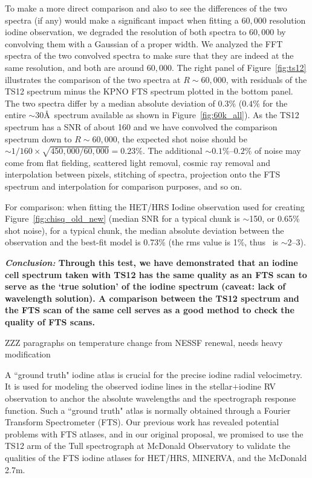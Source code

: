 To make a more direct comparison and also to see the differences of
the two spectra (if any) would make a significant impact when fitting
a $60,000$ resolution iodine observation, we degraded the resolution
of both spectra to $60,000$ by convolving them with a Gaussian of a
proper width. We analyzed the FFT spectra of the two convolved spectra
to make sure that they are indeed at the same resolution, and both are
around $60,000$. The right panel of Figure~\ref{fig:ts12} illustrates
the comparison of the two spectra at $R\sim60,000$, with residuals of
the TS12 spectrum minus the KPNO FTS spectrum plotted in the bottom
panel. The two spectra differ by a median absolute deviation of 0.3\%
($0.4\%$ for the entire $\sim$30\AA\ spectrum available as shown in
Figure~\ref{fig:60k_all}). As the TS12 spectrum has a SNR of about 160
and we have convolved the comparison spectrum down to $R\sim60,000$,
the expected shot noise should be $\sim 1/160\times
\sqrt{450,000/60,000}=0.23\%$. The additional $\sim 0.1\%$--$0.2\%$ of
noise may come from flat fielding, scattered light removal, cosmic ray
removal and interpolation between pixels, stitching of spectra,
projection onto the FTS spectrum and interpolation for comparison
purposes, and so on.

For comparison: when fitting the HET/HRS Iodine observation used for
creating Figure~\ref{fig:chisq_old_new} (median SNR for a typical
chunk is $\sim$150, or 0.65\% shot noise), for a typical chunk, the
median absolute deviation between the observation and the best-fit
model is 0.73\% (the rms value is 1\%, thus \chisq\ is $\sim 2$--$3$).


\textbf{\textit{Conclusion:} Through this test, we have demonstrated that an
  iodine cell spectrum taken with TS12 has the same quality as an FTS
  scan to serve as the `true solution' of the iodine spectrum (caveat:
  lack of wavelength solution). A comparison between the TS12 spectrum
  and the FTS scan of the same cell serves as a good method to check
  the quality of FTS scans.}



ZZZ paragraphs on temperature change from NESSF renewal, needs heavy modification


A ``ground truth" iodine atlas is crucial for the precise iodine
radial velocimetry. It is used for modeling the observed iodine lines
in the stellar$+$iodine RV observation to anchor the absolute
wavelengths and the spectrograph response function. Such a ``ground
truth" atlas is normally obtained through a Fourier Transform
Spectrometer (FTS). Our previous work has revealed potential problems
with FTS atlases, and in our original proposal, we promised to use the
TS12 arm of the Tull spectrograph at McDonald Observatory to validate
the qualities of the FTS iodine atlases for HET/HRS, MINERVA, and the
McDonald 2.7m.

